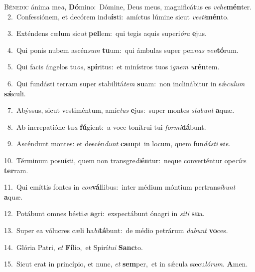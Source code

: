 \lettrine{\initial\textcolor{\initialcolor}{B}}{énedic} ánima me\-\textit{a}\-, \textbf{Dó}\-mino:~\star Dómine, Deus meus, magnificátus es \textit{ve}\-\textit{he}\textbf{mén}ter.\\
{\numbfont\textcolor{\numbcolor}{~2.}}~Confessiónem, et decórem ind\-\textit{u}\-\textbf{ís}ti:~\star amíctus lúmine sicut \textit{ves}\-\textit{ti}\textbf{mén}to.\par
{\numbfont\textcolor{\numbcolor}{~3.}}~Exténdens cælum sic\textit{ut} \textbf{pel}\-lem:~\star qui tegis aquis superi\-\textit{ó}\-\textit{ra} \textbf{e}\-jus.\par
{\numbfont\textcolor{\numbcolor}{~4.}}~Qui ponis nubem ascén\textit{sum} \textbf{tu}\-um:~\star qui ámbulas super pen\textit{nas} \textit{ven}\-\textbf{tó}rum.\par
{\numbfont\textcolor{\numbcolor}{~5.}}~Qui facis ángelos tu\-\textit{os}\-, \textbf{spí}\-ritus:~\star et minístros tuos i\textit{gnem} \textit{u}\-\textbf{rén}tem.\par
{\numbfont\textcolor{\numbcolor}{~6.}}~Qui fundásti terram super stabilitá\textit{tem} \textbf{su}\-am:~\star non inclinábitur in sǽ\-\textit{cu}\-\textit{lum} \textbf{sǽ}\-culi.\par
{\numbfont\textcolor{\numbcolor}{~7.}}~Abýssus, sicut vestiméntum, amíc\textit{tus} \textbf{e}\-jus:~\star super montes \textit{sta}\-\textit{bunt} \textbf{a}\-quæ.\par
{\numbfont\textcolor{\numbcolor}{~8.}}~Ab increpatióne tu\textit{a} \textbf{fú}\-gient:~\star a voce tonítrui tui \textit{for}\-\textit{mi}\textbf{dá}bunt.\par
{\numbfont\textcolor{\numbcolor}{~9.}}~Ascéndunt montes: et descén\textit{dunt} \textbf{cam}\-pi~\star in locum, quem fun\-\textit{dás}\-\textit{ti} \textbf{e}\-is.\par
{\numbfont\textcolor{\numbcolor}{10.}}~Términum posuísti, quem non transgre\-\textit{di}\-\textbf{én}tur:~\star neque converténtur ope\-\textit{rí}\-\textit{re} \textbf{ter}\-ram.\par
{\numbfont\textcolor{\numbcolor}{11.}}~Qui emíttis fontes in \textit{con}\-\textbf{vál}libus:~\star inter médium móntium pertrans\-\textit{í}\-\textit{bunt} \textbf{a}\-quæ.\par
{\numbfont\textcolor{\numbcolor}{12.}}~Potábunt omnes bésti\textit{æ} \textbf{a}\-gri:~\star exspectábunt ónagri in \textit{si}\-\textit{ti} \textbf{su}\-a.\par
{\numbfont\textcolor{\numbcolor}{13.}}~Super ea vólucres cæli ha\-\textit{bi}\-\textbf{tá}bunt:~\star de médio petrárum \textit{da}\-\textit{bunt} \textbf{vo}\-ces.\par
{\numbfont\textcolor{\numbcolor}{14.}}~Glória Patri, \textit{et} \textbf{Fí}\-lio,~\star et Spirí\-\textit{tu}\-\textit{i} \textbf{Sanc}\-to.\par
{\numbfont\textcolor{\numbcolor}{15.}}~Sicut erat in princípio, et nunc, \textit{et} \textbf{sem}\-per,~\star et in sǽcula sæcu\-\textit{ló}\-\textit{rum}. \textbf{A}\-men.\par
